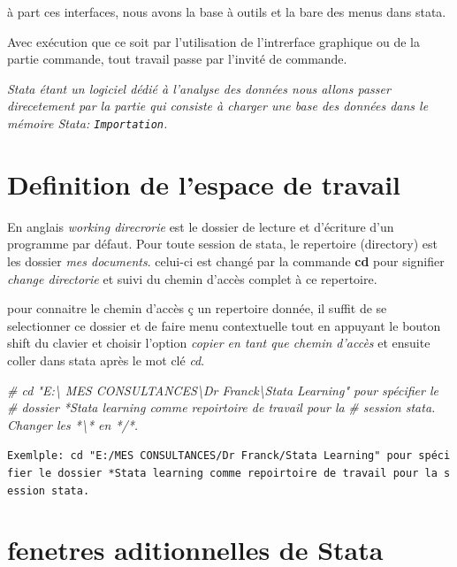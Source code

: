\documentclass[
]{book}
\newenvironment{Shaded}{\begin{snugshade}}{\end{snugshade}}
\newcommand{\CommentTok}[1]{\textcolor[rgb]{0.56,0.35,0.01}{\textit{#1}}}
\begin{document}
à part ces interfaces, nous avons la base à outils et la bare des menus dans stata.

Avec exécution que ce soit par l'utilisation de l'intrerface graphique ou de la partie commande, tout travail passe par l'invité de commande.

\emph{Stata étant un logiciel dédié à l'analyse des données nous allons passer direcetement par la partie qui consiste à charger une base des données dans le mémoire Stata: \texttt{Importation}.}

\hypertarget{definition-de-lespace-de-travail}{%
\section{Definition de l'espace de travail}\label{definition-de-lespace-de-travail}}

En anglais \emph{working direcrorie} est le dossier de lecture et d'écriture d'un programme par défaut. Pour toute session de stata, le repertoire (directory) est les dossier \emph{mes documents}. celui-ci est changé par la commande \textbf{cd} pour signifier \emph{change directorie} et suivi du chemin d'accès complet à ce repertoire.

pour connaitre le chemin d'accès ç un repertoire donnée, il suffit de se selectionner ce dossier et de faire menu contextuelle tout en appuyant le bouton shift du clavier et choisir l'option \emph{copier en tant que chemin d'accès} et ensuite coller dans stata après le mot clé \emph{cd}.

\begin{Shaded}
\begin{Highlighting}[]
  \CommentTok{\# cd "E:\textbackslash{} MES CONSULTANCES\textbackslash{}Dr Franck\textbackslash{}Stata Learning" pour spécifier le }
  \CommentTok{\#  dossier *Stata learning comme repoirtoire de travail pour la }
  \CommentTok{\# session stata. Changer les *\textbackslash{}* en */*.}
\end{Highlighting}
\end{Shaded}

\texttt{Exemlple:\ cd\ "E:/MES\ CONSULTANCES/Dr\ Franck/Stata\ Learning"\ pour\ spécifier\ le\ dossier\ *Stata\ learning\ comme\ repoirtoire\ de\ travail\ pour\ la\ session\ stata.}

\hypertarget{fenetres-aditionnelles-de-stata}{%
\section{fenetres aditionnelles de Stata}\label{fenetres-aditionnelles-de-stata}}
\end{document}
